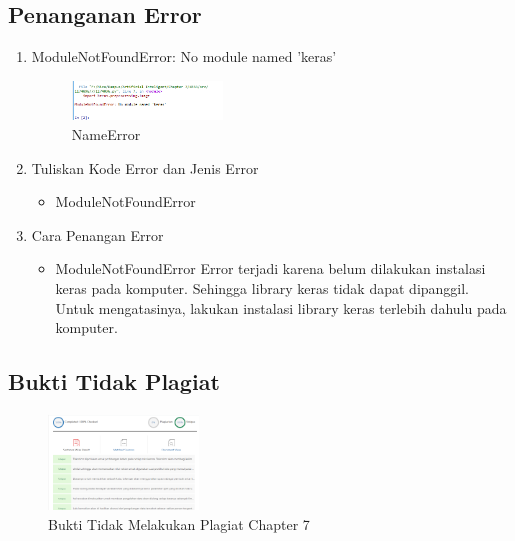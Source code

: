 \subsection{Penanganan Error}
\begin{enumerate}
	\item ModuleNotFoundError: No module named 'keras'
	\begin{figure}[H]
		\includegraphics[width=4cm]{figures/1174096/tugas7/error.PNG}
		\centering
		\caption{NameError}
	\end{figure}
	\item Tuliskan Kode Error dan Jenis Error
	\begin{itemize}
		\item ModuleNotFoundError
	\end{itemize}
	\item Cara Penangan Error
	\begin{itemize}
		\item ModuleNotFoundError
		\hfill\break
		Error terjadi karena belum dilakukan instalasi keras pada komputer. Sehingga library keras tidak dapat dipanggil. Untuk mengatasinya, lakukan instalasi library keras terlebih dahulu pada komputer.
	\end{itemize}
\end{enumerate}

\subsection{Bukti Tidak Plagiat}
\begin{figure}[H]
\centering
	\includegraphics[width=4cm]{figures/1174096/tugas7/plagiarisme.PNG}
	\caption{Bukti Tidak Melakukan Plagiat Chapter 7}
\end{figure}
